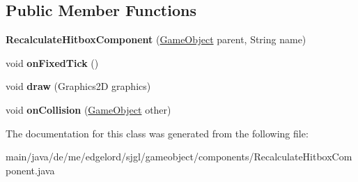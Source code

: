 \subsection*{Public Member Functions}
\begin{DoxyCompactItemize}
\item 
\mbox{\label{classde_1_1me_1_1edgelord_1_1sjgl_1_1gameobject_1_1components_1_1_recalculate_hitbox_component_affe880c5c0c85babfbd6ef318c8cdb12}} 
{\bfseries Recalculate\+Hitbox\+Component} (\mbox{\hyperlink{classde_1_1me_1_1edgelord_1_1sjgl_1_1gameobject_1_1_game_object}{Game\+Object}} parent, String name)
\item 
\mbox{\label{classde_1_1me_1_1edgelord_1_1sjgl_1_1gameobject_1_1components_1_1_recalculate_hitbox_component_a2eb7f3b4e5a48500e32a5aa385ecdfbd}} 
void {\bfseries on\+Fixed\+Tick} ()
\item 
\mbox{\label{classde_1_1me_1_1edgelord_1_1sjgl_1_1gameobject_1_1components_1_1_recalculate_hitbox_component_ad4c431f221a6f70a4727090eed535cf4}} 
void {\bfseries draw} (Graphics2D graphics)
\item 
\mbox{\label{classde_1_1me_1_1edgelord_1_1sjgl_1_1gameobject_1_1components_1_1_recalculate_hitbox_component_a4f065408cc9c80e3c4e433f5bfc6ad12}} 
void {\bfseries on\+Collision} (\mbox{\hyperlink{classde_1_1me_1_1edgelord_1_1sjgl_1_1gameobject_1_1_game_object}{Game\+Object}} other)
\end{DoxyCompactItemize}


The documentation for this class was generated from the following file\+:\begin{DoxyCompactItemize}
\item 
main/java/de/me/edgelord/sjgl/gameobject/components/Recalculate\+Hitbox\+Component.\+java\end{DoxyCompactItemize}
